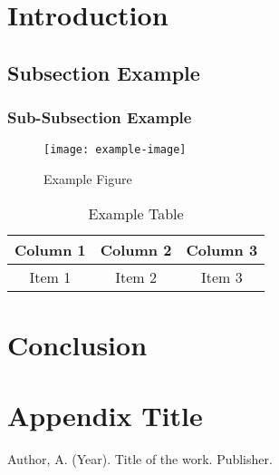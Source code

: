 \documentclass[12pt]{article}
\begin{document}
\section{Introduction}
\lipsum[2-3] %

\subsection{Subsection Example}
\lipsum[4]

\subsubsection{Sub-Subsection Example}
\lipsum[5]

\begin{figure}[H]
    \centering
    \texttt{[image: example-image]}
    \caption{Example Figure}
    \label{fig:example}
\end{figure}

\begin{table}[H]
    \centering
    \begin{tabular}{|c|c|c|}
        \hline
        Column 1 & Column 2 & Column 3 \\
        \hline
        Item 1 & Item 2 & Item 3 \\
        \hline
    \end{tabular}
    \caption{Example Table}
    \label{tab:example}
\end{table}

\section{Conclusion}
\lipsum[6] %

\appendix
\section{Appendix Title}
\lipsum[7] %

\begin{thebibliography}{99}
 Author, A. (Year). Title of the work. Publisher.
\end{thebibliography}
\end{document}
